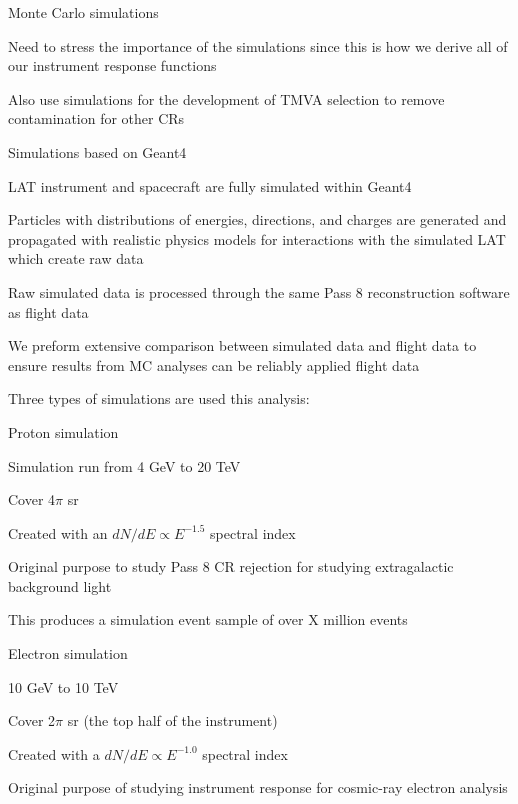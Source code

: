 \documentclass{article}
\begin{document}
\begin{myEnumerate}
\begin{myEnumerate}
			\end{myEnumerate}
		\item Monte Carlo simulations
			\begin{myEnumerate}
				\item Need to stress the importance of the simulations since this is how we derive all of our instrument response functions 
				\item Also use simulations for the development of TMVA selection to remove contamination for other CRs
				\item Simulations based on Geant4
				\item LAT instrument and spacecraft are fully simulated within Geant4
				\item Particles with distributions of energies, directions, and charges are generated and propagated with realistic physics models for interactions with the simulated LAT which create raw data
				\item Raw simulated data is processed through the same Pass 8 reconstruction software as flight data
				\item We preform extensive comparison between simulated data and flight data to ensure results from MC analyses can be reliably applied flight data
				\item Three types of simulations are used this analysis:
				\item Proton simulation
				\begin{myEnumerate}
					\item Simulation run from 4 GeV to 20 TeV
					\item Cover 4$\pi$ sr 
					\item Created with an $dN/dE \propto E^{-1.5}$ spectral index
					\item Original purpose to study Pass 8 CR rejection for studying extragalactic background light 
					\item This produces a simulation event sample of over X million events
				\end{myEnumerate}
				\item Electron simulation
				\begin{myEnumerate}
					\item  10 GeV to 10 TeV
					\item Cover 2$\pi$ sr (the top half of the instrument)
					\item Created with a $dN/dE \propto E^{-1.0}$ spectral index
					\item Original purpose of studying instrument response for cosmic-ray electron analysis

\end{myEnumerate}
\end{myEnumerate}
\end{myEnumerate}
\end{document}
